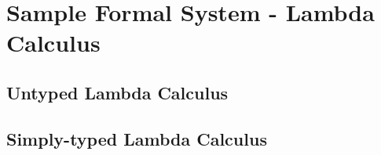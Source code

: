 \documentclass[master.tex]{subfiles}
\begin{document}
\chapter{Sample Formal System - Lambda Calculus}

\section{Untyped Lambda Calculus}
\section{Simply-typed Lambda Calculus}
\end{document}
